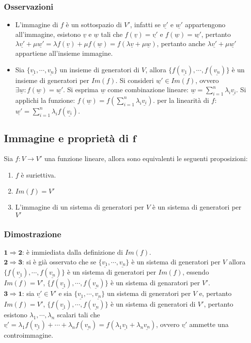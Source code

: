 \subsubsection{Osservazioni}
\begin{itemize}
\item L'immagine di $f$ \`e un sottospazio di $V'$, infatti se $\underline{v'}$ e $\underline{w'}$ appartengono all'immagine, esistono $\underline{v}$ e $\underline{w}$ tali che 
$f(\underline{v})=\underline{v'}$ e $f(\underline{w})=\underline{w'}$, pertanto $\lambda\underline{v'}+\mu\underline{w'}=\lambda f(\underline{v})+\mu f(\underline{w})=f(\lambda
\underline{v}+\mu\underline{w})$, pertanto anche $\lambda\underline{v'}+\mu\underline{w'}$ appartiene all'insieme immagine.
\item Sia $\{\underline{v_1},\cdots,\underline{v_n}\}$ un insieme di generatori di $V$, allora $\{f(\underline{v_1}),\cdots,f(\underline{v_n})\}$ \`e un insieme di generatori per 
$Im(f)$. Si consideri $\underline{w'}\in Im(f)$, ovvero $\exists\underline{w}:f(\underline{w})=\underline{w'}$. Si esprima $\underline{w}$ come combinazione lineare: $
\underline{w}=\sum\limits_{i=1}^n\lambda_i\underline{v_i}$. Si applichi la funzione: $f(\underline{w})=f(\sum\limits_{i=1}^n\lambda_i\underline{v_i})$. per la linearit\`a di $f$:
$\underline{w'}=\sum\limits_{i=1}^n\lambda_i f(\underline{v_i})$.
\end{itemize}
\subsection{Immagine e propriet\`a di $\mathbf{f}$}
Sia $f:V\rightarrow V'$ una funzione lineare, allora sono equivalenti le seguenti proposizioni:
\begin{enumerate}
\item $f$ \`e suriettiva.
\item $Im(f)=V'$
\item L'immagine di un sistema di generatori per $V$ \`e un sistema di generatori per $V'$
\end{enumerate}
\subsubsection{Dimostrazione}
$\mathbf{1\Rightarrow 2}$: \`e immiediata dalla definizione di $Im(f)$.\\
$\mathbf{2\Rightarrow 3}$: si \`e gi\`a osservato che se $\{\underline{v_1},\cdots,\underline{v_n}\}$ \`e un sistema di generatori per $V$ allora $\{f(\underline{v_1}),
\cdots,f(\underline{v_n})\}$ \`e un sistema di generatori per $Im(f)$, essendo $Im(f)=V'$, $\{f(\underline{v_1}),\cdots,f(\underline{v_n})\}$ \`e un sistema di genaratori per 
$V'$.\\
$\mathbf{3\Rightarrow 1}$: sia $\underline{v'}\in V'$ e sia $\{\underline{v_1},\cdots,\underline{v_n}\}$ un sistema di generatori per $V$ e, pertanto $Im(f)=V'$, 
$\{f(\underline{v_1}),\cdots,f(\underline{v_n})\}$ \`e un sistema di generatori di $V'$, pertanto esistono $\lambda_1,\cdots,\lambda_n$ scalari tali che $\underline{v'}=\lambda_1 
f(\underline{v_1})+\cdots+\lambda_n f(\underline{v_n})=f(\lambda_1\underline{v_1}+\lambda_n\underline{v_n})$, ovvero $\underline{v'}$ ammette una controimmagine. 

